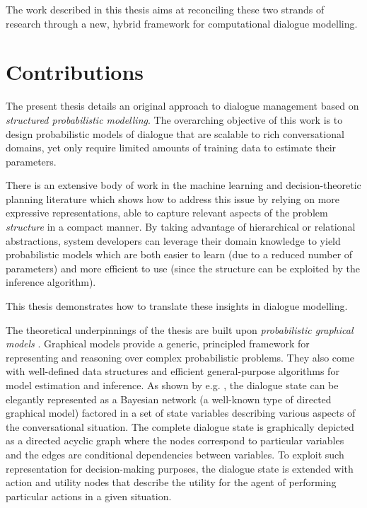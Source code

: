 The work described in this thesis aims at reconciling these two strands of research through a new, hybrid framework for computational dialogue modelling. 

\section{Contributions}

The present thesis details an original approach to dialogue management based on \textit{structured probabilistic modelling}.  The overarching objective of this work is to design probabilistic models of dialogue that are scalable to rich conversational domains, yet only require limited amounts of training data to estimate their parameters.

There is an extensive body of work in the machine learning and decision-theoretic planning literature which shows how to address this issue by relying on more expressive representations, able to capture relevant aspects of the problem \textit{structure} in a compact manner. By taking advantage of hierarchical or relational abstractions, system developers can leverage their domain knowledge to yield probabilistic models which are both easier to learn (due to a reduced number of parameters) and more efficient to use (since the structure can be exploited by the inference algorithm).

This thesis demonstrates how to translate these insights in dialogue modelling. 

The theoretical underpinnings of the thesis are built upon \textit{probabilistic graphical models} \citep{Koller+Friedman:09}.  Graphical models provide a generic, principled framework for representing and reasoning over complex probabilistic problems. They also come with well-defined data structures and efficient general-purpose algorithms for model estimation and inference.  As shown  by e.g. \cite{Thomson:2010:BUD:1772996.1773040}, the dialogue state can be elegantly represented as a Bayesian network (a well-known type of directed graphical model) factored in a set of state variables describing various aspects of the conversational situation.  The complete dialogue state is graphically depicted as a directed acyclic graph where the nodes correspond to particular variables and the edges are conditional dependencies between variables. To exploit such representation for decision-making purposes, the dialogue state is extended with action and utility nodes that describe the utility for the agent of performing particular actions in a given situation. 

